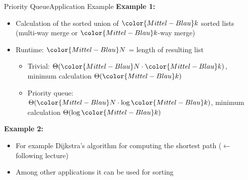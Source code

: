 \begin{frame}{Priority Queue}{Application Example}
  \textbf{Example 1:}
  \begin{itemize}
    \item<2->
      Calculation of the sorted union of ${\color{Mittel-Blau}k}$ sorted lists\\
      (multi-way merge or ${\color{Mittel-Blau}k}$-way merge)
    \item<3->
      Runtime:
      ${\color{Mittel-Blau}N}$ = length of resulting list
      \begin{itemize}
        \item<4->
          Trivial:
          \begin{math}
            \Theta({\color{Mittel-Blau}N} \cdot {\color{Mittel-Blau}k})
          \end{math},
          minimum calculation $\Theta({\color{Mittel-Blau}k})$
        \item<5->
          Priority queue:
          \begin{math}
            \Theta({\color{Mittel-Blau}N} \cdot \log {\color{Mittel-Blau}k})
          \end{math},
          minimum calculation  $\Theta(\log {\color{Mittel-Blau}k})$
      \end{itemize}
  \end{itemize}
  \textbf{Example 2:}
  \begin{itemize}
    \item<7->
      For example Dijkstra's algorithm for computing the shortest path ($\leftarrow$ following lecture)
    \item<8->
      Among other applications it can be used for sorting
  \end{itemize}
\end{frame}


